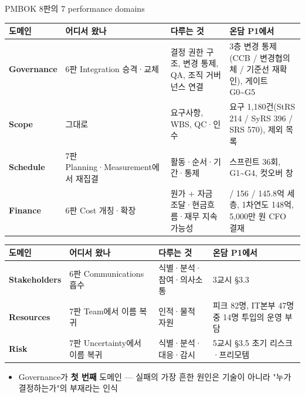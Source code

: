 \begin{frame}[allowframebreaks=1.0]{PMBOK 8판의 7 performance domains}
\small
{\footnotesize\setlength{\tabcolsep}{3pt}\renewcommand{\arraystretch}{1.12}
\begin{tabular}{@{}>{\raggedright\arraybackslash}p{}>{\raggedright\arraybackslash}p{}>{\raggedright\arraybackslash}p{}>{\raggedright\arraybackslash}p{}@{}}
\toprule
\textbf{도메인} & \textbf{어디서 왔나} & \textbf{다루는 것} & \textbf{온담 P1에서} \\
\midrule
\textbf{Governance} & 6판 Integration 승격·교체 & 결정 권한 구조, 변경 통제, QA, 조직 거버넌스 연결 & 3층 변경 통제(CCB / 변경협의체 / 기준선 재확인), 게이트 G0\textasciitilde{}G5 \\
\textbf{Scope} & 그대로 & 요구사항, WBS, QC·인수 & 요구 1,180건(StRS 214 / SyRS 396 / SRS 570), 제외 목록 \\
\textbf{Schedule} & 7판 Planning·Measurement에서 재집결 & 활동·순서·기간·통제 & 스프린트 36회, G1\textasciitilde{}G4, 컷오버 창 \\
\textbf{Finance} & 6판 Cost 개칭·확장 & 원가 + 자금 조달·현금흐름·재무 지속가능성 & 168 / 156 / 145.8억 세 층, 1차연도 148억, 5,000만 원 CFO 결재 \\
\bottomrule
\end{tabular}}
\par\smallskip
\framebreak
{\footnotesize\setlength{\tabcolsep}{3pt}\renewcommand{\arraystretch}{1.12}
\begin{tabular}{@{}>{\raggedright\arraybackslash}p{}>{\raggedright\arraybackslash}p{}>{\raggedright\arraybackslash}p{}>{\raggedright\arraybackslash}p{}@{}}
\toprule
\textbf{도메인} & \textbf{어디서 왔나} & \textbf{다루는 것} & \textbf{온담 P1에서} \\
\midrule
\textbf{Stakeholders} & 6판 Communications 흡수 & 식별·분석·참여·의사소통 & 3교시 §3.3 \\
\textbf{Resources} & 7판 Team에서 이름 복귀 & 인적·물적 자원 & 피크 82명, IT본부 47명 중 14명 투입의 운영 부담 \\
\textbf{Risk} & 7판 Uncertainty에서 이름 복귀 & 식별·분석·대응·감시 & 5교시 §3.5 초기 리스크·프리모템 \\
\bottomrule
\end{tabular}}
\par\smallskip
\begin{itemize}
\item\relax Governance가 \textbf{첫 번째} 도메인 — 실패의 가장 흔한 원인은 기술이 아니라 "누가 결정하는가"의 부재라는 인식
\end{itemize}
\end{frame}

